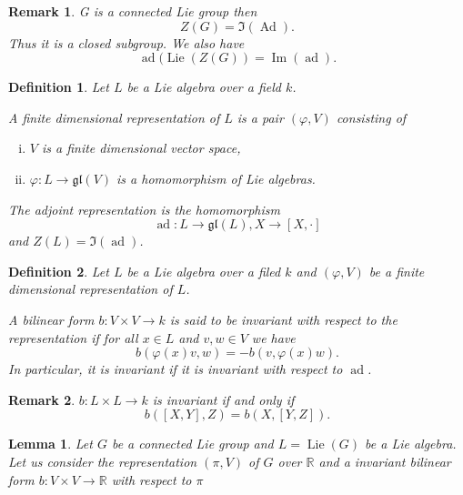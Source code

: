 \documentclass{article}
\newtheorem{definition}{Definition}[section]
\newtheorem{lemma}{Lemma}[section]
\newtheorem{remark}{Remark}[section]
\numberwithin{equation}{section}
\DeclareMathOperator{\Image}{Im}
\DeclareMathOperator{\Ad}{Ad}
\DeclareMathOperator{\ad}{ad}
\DeclareMathOperator{\Lie}{Lie}
\begin{document}
\begin{remark}
G is a connected Lie group then
\begin{equation*}
Z(G)=\Im(\Ad).
\end{equation*}
Thus it is a closed subgroup. We also have
\begin{equation*}
\ad(\Lie(Z(G)) = \Image(\ad).
\end{equation*}
\end{remark}

\begin{definition}
Let $L$ be a Lie algebra over a field $k$.\\
\par A finite dimensional representation of $L$ is a pair $(\varphi, V)$ consisting of 
\begin{enumerate}[i).]
\item $V$ is a finite dimensional vector space,
\item $\varphi:L\to\mathfrak{gl}(V)$ is a homomorphism of Lie algebras.
\end{enumerate}
The adjoint representation is the homomorphism 
\begin{equation*}
\ad:L\to\mathfrak{gl}(L), X\to[X,\cdot]
\end{equation*}
and $Z(L)=\Im(\ad)$.%
\end{definition}

\begin{definition}
Let $L$ be a Lie algebra over a filed $k$ and $(\varphi, V)$ be a finite dimensional representation of $L$.\\
\par A bilinear form $b:V\times V\to k$ is said to be invariant with respect to the representation if for all $x\in L$ and $v,w\in V$ we have
\begin{equation*}
b(\varphi(x)v,w)=-b(v,\varphi(x)w).
\end{equation*}
In particular, it is invariant if it is invariant with respect to $\ad$.
\end{definition}

\begin{remark}
$b:L\times L\to k$ is invariant if and only if 
\begin{equation*}
b([X,Y],Z) = b(X,[Y,Z]).
\end{equation*}
\end{remark}

\begin{lemma}
Let $G$ be a connected Lie group and $L=\Lie(G)$ be a Lie algebra. Let us consider the representation $(\pi,V)$ of $G$ over $\mathbb{R}$ and a invariant bilinear form $b:V\times V\to \mathbb{R}$ with respect to $\pi$
\end{lemma}
\end{document}
